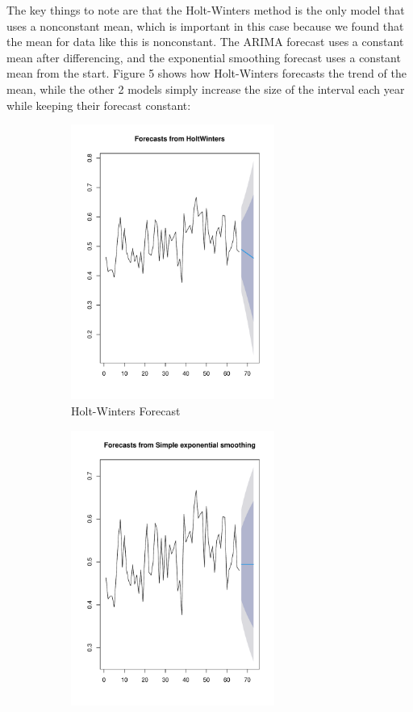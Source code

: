 \documentclass[12pt]{article}
\begin{document}
The key things to note are that the Holt-Winters method is the only model that uses a nonconstant mean, which is important in this case because we found that the mean for data like this is nonconstant. The ARIMA forecast uses a constant mean after differencing, and the exponential smoothing forecast uses a constant mean from the start. Figure 5 shows how Holt-Winters forecasts the trend of the mean, while the other 2 models simply increase the size of the interval each year while keeping their forecast constant:\\
\begin{figure}[h]
\begin{subfigure}{0.32\textwidth}
\includegraphics[width=0.9\linewidth, height=9cm]{hw fore.pdf} 
\caption{Holt-Winters Forecast}
\label{fig:subim1}
\end{subfigure}
\begin{subfigure}{0.32\textwidth}
\includegraphics[width=0.9\linewidth, height=9cm]{es fore.pdf}

\end{subfigure}
\end{figure}
\end{document}
